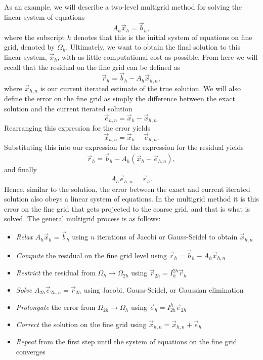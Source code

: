 As an example, we will describe a two-level multigrid method for solving the linear system of equations
\begin{equation}
	A_h \vec{x}_h = \vec{b}_h,
\end{equation}
where the subscript $h$ denotes that this is the initial system of equations on fine grid, denoted by $\Omega_h$. Ultimately, we want to obtain the final solution to this linear system, $\vec{x}_h$, with as little computational cost as possible. From here we will recall that the residual on the fine grid can be defined as
\begin{equation}
	\vec{r}_h = \vec{b}_h - A_h \vec{x}_{h,n},
\end{equation}
where $\vec{x}_{h,n}$ is our current iterated estimate of the true solution. We will also define the error on the fine grid as simply the difference between the exact solution and the current iterated solution
\begin{equation}
	\vec{e}_{h,n} = \vec{x}_{h} - \vec{x}_{h,n}.
\end{equation}
Rearranging this expression for the error yields
\begin{equation}
	\vec{x}_{h,n} =  \vec{x}_{h} - \vec{e}_{h,n}.
\end{equation}
Substituting this into our expression for the expression for the residual yields
\begin{equation}
	\vec{r}_h = \vec{b}_h - A_h (\vec{x}_{h} - \vec{e}_{h,n}),
\end{equation}
and finally
\begin{equation}
	A_h \vec{e}_{h,n} = \vec{r}_h.
\end{equation}
Hence, similar to the solution, the error between the exact and current iterated solution also obeys a linear system of equations. In the multigrid method it is this error on the fine grid that gets projected to the coarse grid, and that is what is solved. The general multigrid process is as follows:
\begin{itemize}
	\item {\it Relax} $A_h \vec{x}_h = \vec{b}_h$ using $n$ iterations of Jacobi or Gauss-Seidel to obtain $\vec{x}_{h,n}$
	\item {\it Compute} the residual on the fine grid level using $\vec{r}_h = \vec{b}_h - A_h \vec{x}_{h,n}$
	\item {\it Restrict} the residual from $\Omega_h \rightarrow \Omega_{2h}$ using $\vec{r}_{2h} = I_{h}^{2h} \vec{r}_h$
	\item {\it Solve} $A_{2h} \vec{e}_{2h,n} = \vec{r}_{2h}$ using Jacobi, Gauss-Seidel, or Gaussian elimination
	\item {\it Prolongate} the error from $\Omega_{2h} \rightarrow \Omega_{h}$ using $\vec{e}_{h} = I_{2h}^{h} \vec{e}_{2h}$
	\item {\it Correct} the solution on the fine grid using $\vec{x}_{h,n} = \vec{x}_{h,n} + \vec{e}_{h}$
	\item {\it Repeat} from the first step until the system of equations on the fine grid converges
\end{itemize}

